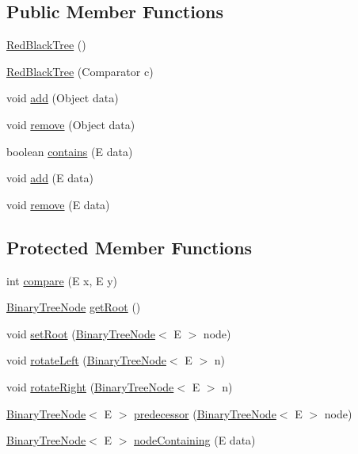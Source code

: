 \subsection*{Public Member Functions}
\begin{DoxyCompactItemize}
\item 
\hyperlink{class_red_black_tree_a1c9e5ed89408fceece587beaa50e6ab9}{Red\+Black\+Tree} ()
\item 
\hyperlink{class_red_black_tree_a7dfa5ea4748978ca6afa51fd6b208f4e}{Red\+Black\+Tree} (Comparator c)
\item 
void \hyperlink{class_red_black_tree_a907af3b35b794f5d9f9743f2d57d39c4}{add} (Object data)
\item 
void \hyperlink{class_red_black_tree_a8fdca1f2db448926f4b45eeac4c188b3}{remove} (Object data)
\item 
boolean \hyperlink{class_binary_search_tree_aecf969906c0201b48e8930a5e3833b36}{contains} (E data)
\item 
void \hyperlink{class_binary_search_tree_a3a559cec2b77572e287bba2eea43a2ea}{add} (E data)
\item 
void \hyperlink{class_binary_search_tree_a8e90ad601540c44c53bfdb2b1e9b464c}{remove} (E data)
\end{DoxyCompactItemize}
\subsection*{Protected Member Functions}
\begin{DoxyCompactItemize}
\item 
int \hyperlink{class_binary_search_tree_af46a1a86813d1bdfe3f745bc3641391b}{compare} (E x, E y)
\item 
\hyperlink{interface_binary_tree_node}{Binary\+Tree\+Node} \hyperlink{class_binary_search_tree_ac6a71b51d00f3abe651eb14bbd5f2c59}{get\+Root} ()
\item 
void \hyperlink{class_binary_search_tree_a6fa21028fbf3da7d3b0c31354641284c}{set\+Root} (\hyperlink{interface_binary_tree_node}{Binary\+Tree\+Node}$<$ E $>$ node)
\item 
void \hyperlink{class_binary_search_tree_affe3b4c5e9e5e895e3e44c94de81b5b3}{rotate\+Left} (\hyperlink{interface_binary_tree_node}{Binary\+Tree\+Node}$<$ E $>$ n)
\item 
void \hyperlink{class_binary_search_tree_a69140db7c29fbc76c5d844350771cfe4}{rotate\+Right} (\hyperlink{interface_binary_tree_node}{Binary\+Tree\+Node}$<$ E $>$ n)
\item 
\hyperlink{interface_binary_tree_node}{Binary\+Tree\+Node}$<$ E $>$ \hyperlink{class_binary_search_tree_a799d83bd6d39d322f1839e61e3d23fc4}{predecessor} (\hyperlink{interface_binary_tree_node}{Binary\+Tree\+Node}$<$ E $>$ node)
\item 
\hyperlink{interface_binary_tree_node}{Binary\+Tree\+Node}$<$ E $>$ \hyperlink{class_binary_search_tree_af3164d82d7ba30c495634fceeff9acd5}{node\+Containing} (E data)
\end{DoxyCompactItemize}
